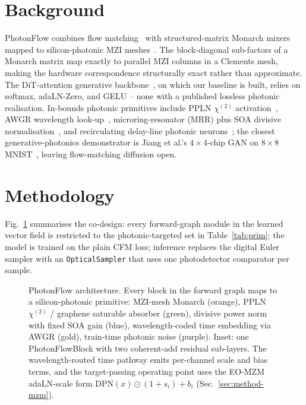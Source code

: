 \documentclass[conference]{IEEEtran}
\begin{document}
\section{Background}
\label{sec:lit}
PhotonFlow combines flow
matching~\cite{lipman2023,liu2022rf,peebles2023,esser2024,karras2022edm,hang2023minsnr,fasterdit2024}
with structured-matrix Monarch
mixers~\cite{dao2022,dao2023m2,hardt2017} mapped to silicon-photonic
MZI meshes~\cite{shen2017,clements2016,zhan2024,ning2024,ning2025}.
The block-diagonal sub-factors of a Monarch matrix map exactly to
parallel MZI columns in a Clements mesh, making the hardware
correspondence structurally exact rather than approximate.
The DiT-attention generative
backbone~\cite{peebles2023}, on which our baseline is built, relies on
softmax, adaLN-Zero, and GELU -- none with a published lossless
photonic realisation.  In-bounds photonic primitives include PPLN
$\chi^{(2)}$ activation~\cite{ppln2026}, AWGR wavelength
look-up~\cite{xu2021tops}, microring-resonator (MRR) plus
SOA divisive normalisation~\cite{zhang2014mrr,huang2020mrr}, and recirculating
delay-line photonic neurons~\cite{natcompsci2025}; the closest
generative-photonics demonstrator is Jiang et al.'s $4{\times}4$-chip GAN on
$8{\times}8$ MNIST~\cite{zhu2026}, leaving flow-matching diffusion
open.

\section{Methodology}
\label{sec:method}

Fig.~\ref{fig:method} summarises the co-design: every forward-graph
module in the learned vector field is restricted to the
photonic-targeted set in Table~\ref{tab:prim}; the model is trained
on the plain CFM loss; inference replaces the digital Euler sampler
with an
\texttt{OpticalSampler} that uses one photodetector comparator per
sample.

\begin{figure}[t]
\centering

\caption{PhotonFlow architecture.  Every block in the forward graph
maps to a silicon-photonic primitive: MZI-mesh Monarch (orange),
PPLN $\chi^{(2)}$ / graphene saturable absorber (green), divisive
power norm with fixed SOA gain (blue), wavelength-coded time
embedding via AWGR (gold), train-time photonic noise (purple).
Inset: one PhotonFlowBlock with two coherent-add residual
sub-layers.  The wavelength-routed time pathway emits per-channel
scale and bias terms, and the target-passing operating point uses
the EO-MZM adaLN-scale form
$\mathrm{DPN}(x)\odot(1+s_i)+b_i$ (Sec.~\ref{sec:method-mzm}).}
\label{fig:method}
\end{figure}
\end{document}

